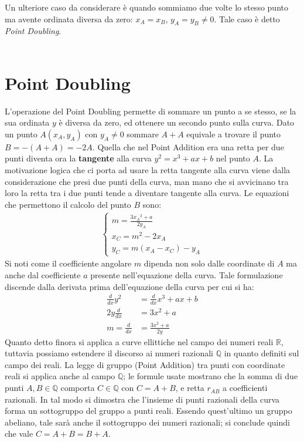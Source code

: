 \documentclass[a4paper,12pt]{tesiinfo}
\newcommand\ddfrac[2]{\frac{\displaystyle #1}{\displaystyle #2}}
\begin{document}
%
%
%
%
%
%
Un ulteriore caso da considerare \`e quando sommiamo due volte lo stesso punto ma avente ordinata diversa da zero: $x_A = x_B$, $y_A = y_B \ne 0$. Tale caso \`e detto \textit{Point Doubling}.
\\
\\
\section{Point Doubling}
L'operazione del Point Doubling permette di sommare un punto a se stesso, se la sua ordinata $y$ \`e diversa da zero, ed ottenere un secondo punto sulla curva. Dato un punto $A(x_A, y_A)$ con $y_A \ne 0$ sommare $A+A$ equivale a trovare il punto $B = -(A+A) = -2A$. Quella che nel Point Addition era una retta per due punti diventa ora la \textbf{tangente} alla curva $y^2 = x^3 + ax +b$ nel punto $A$. La motivazione logica che ci porta ad usare la retta tangente alla curva viene dalla considerazione che presi due punti della curva, man mano che si avvicinano tra loro la retta tra i due punti tende a diventare tangente alla curva. Le equazioni che permettono il calcolo del punto $B$ sono:
\begin{align*}
\begin{cases}
m = \ddfrac{3{x_A}^2 + a}{2y_A}\\
x_C = m^2 - 2x_A\\
y_C = m(x_A - x_C)-y_A
\end{cases}
\end{align*}
Si noti come il coefficiente angolare $m$ dipenda non solo dalle coordinate di $A$ ma anche dal coefficiente $a$ presente nell'equazione della curva. Tale formulazione discende dalla derivata prima dell'equazione della curva per cui si ha:
\begin{align*}
\ddfrac{d}{dx}y^2 &= \ddfrac{d}{dx}x^3 + ax + b\\
2y\ddfrac{d}{dx} &= 3x^2 + a\\
m = \ddfrac{d}{dx} &= \ddfrac{3x^2 + a}{2y}
\end{align*}
Quanto detto finora si applica a curve ellittiche nel campo dei numeri reali $\mathbb{R}$, tuttavia possiamo estendere il discorso ai numeri razionali $\mathbb{Q}$ in quanto definiti sul campo dei reali. La legge di gruppo (Point Addition) tra punti con coordinate reali si applica anche al campo $\mathbb{Q}$; le formule usate mostrano che la somma di due punti $A, B \in \mathbb{Q}$ comporta $C \in \mathbb{Q}$ con $C = A + B$, e retta $r_{AB}$ a coefficienti razionali. In tal modo si dimostra che l'insieme di punti razionali della curva forma un sottogruppo del gruppo a punti reali. Essendo quest'ultimo un gruppo abeliano, tale sar\`a anche il sottogruppo dei numeri razionali; si conclude quindi che vale $C = A+B = B+A$.
\\
\\
\end{document}
